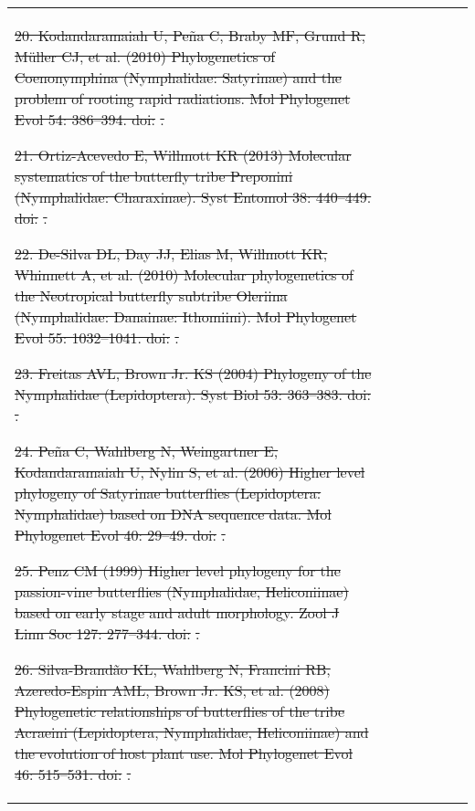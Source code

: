 \documentclass[10pt]{article}
\providecommand{\DIFdeltex}[1]{{\protect\color{red}\sout{#1}}}                      %
\providecommand{\DIFdelFL}[1]{\DIFdel{#1}} %
\providecommand{\DIFdel}[1]{\texorpdfstring{\DIFdeltex{#1}}{}} %
\begin{document}
\begin{table}[!h]
\begin{tabular}{lccrrcl}
\DIFdelFL{20. Kodandaramaiah U, Peña C, Braby MF, Grund R, Müller CJ, et al.
(2010) Phylogenetics of Coenonymphina (Nymphalidae: Satyrinae) and the
problem of rooting rapid radiations. Mol Phylogenet Evol 54: 386--394.
doi:}%
\DIFdelFL{.
}%

\DIFdelFL{21. Ortiz-Acevedo E, Willmott KR (2013) Molecular systematics of the
butterfly tribe Preponini (Nymphalidae: Charaxinae). Syst Entomol 38:
440--449.
doi:}%
\DIFdelFL{.
}%

\DIFdelFL{22. De-Silva DL, Day JJ, Elias M, Willmott KR, Whinnett A, et al. (2010)
Molecular phylogenetics of the Neotropical butterfly subtribe Oleriina
(Nymphalidae: Danainae: Ithomiini). Mol Phylogenet Evol 55: 1032--1041.
doi:}%
\DIFdelFL{.
}%

\DIFdelFL{23. Freitas AVL, Brown Jr. KS (2004) Phylogeny of the Nymphalidae
(Lepidoptera). Syst Biol 53: 363--383.
doi:}%
\DIFdelFL{.
}%

\DIFdelFL{24. Peña C, Wahlberg N, Weingartner E, Kodandaramaiah U, Nylin S, et al.
(2006) Higher level phylogeny of Satyrinae butterflies (Lepidoptera:
Nymphalidae) based on DNA sequence data. Mol Phylogenet Evol 40: 29--49.
doi:}%
\DIFdelFL{.
}%

\DIFdelFL{25. Penz CM (1999) Higher level phylogeny for the passion-vine
butterflies (Nymphalidae, Heliconiinae) based on early stage and adult
morphology. Zool J Linn Soc 127: 277--344.
doi:}%
\DIFdelFL{.
}%

\DIFdelFL{26. Silva-Brandão KL, Wahlberg N, Francini RB, Azeredo-Espin AML, Brown
Jr. KS, et al. (2008) Phylogenetic relationships of butterflies of the
tribe Acraeini (Lepidoptera, Nymphalidae, Heliconiinae) and the
evolution of host plant use. Mol Phylogenet Evol 46: 515--531.
doi:}%
\DIFdelFL{.
}%


\end{tabular}
\end{table}
\end{document}
